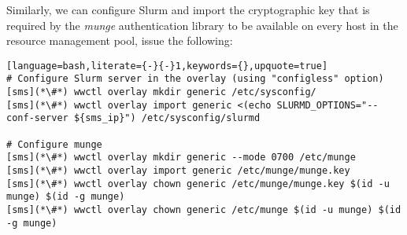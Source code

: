 \noindent Similarly, we can configure Slurm and import the cryptographic
key that is required by the {\em munge} authentication library to be available
on every host in the resource management pool, issue the following:

\begin{lstlisting}[language=bash,literate={-}{-}1,keywords={},upquote=true]
# Configure Slurm server in the overlay (using "configless" option)
[sms](*\#*) wwctl overlay mkdir generic /etc/sysconfig/
[sms](*\#*) wwctl overlay import generic <(echo SLURMD_OPTIONS="--conf-server ${sms_ip}") /etc/sysconfig/slurmd
  
# Configure munge
[sms](*\#*) wwctl overlay mkdir generic --mode 0700 /etc/munge
[sms](*\#*) wwctl overlay import generic /etc/munge/munge.key
[sms](*\#*) wwctl overlay chown generic /etc/munge/munge.key $(id -u munge) $(id -g munge)
[sms](*\#*) wwctl overlay chown generic /etc/munge $(id -u munge) $(id -g munge)
\end{lstlisting}
